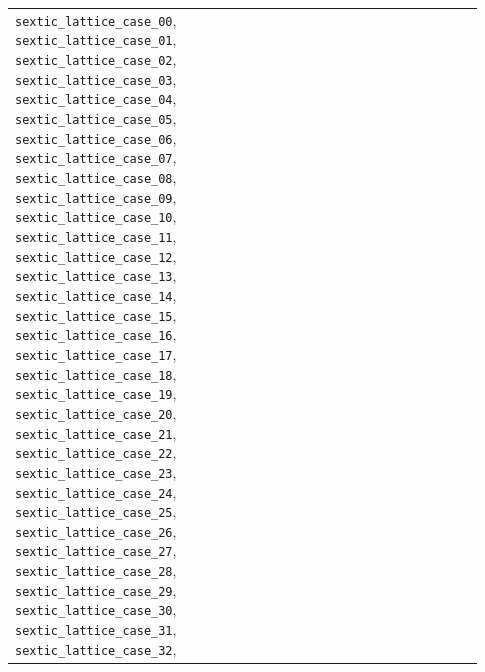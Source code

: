 \begin{longtable}{@{}>{\raggedright\arraybackslash}p{0.31\linewidth}>{\raggedright\arraybackslash}p{0.62\linewidth}@{}}
\texttt{sextic\_}\allowbreak\texttt{lattice\_}\allowbreak\texttt{case\_}\allowbreak\texttt{00}, \texttt{sextic\_}\allowbreak\texttt{lattice\_}\allowbreak\texttt{case\_}\allowbreak\texttt{01}, \texttt{sextic\_}\allowbreak\texttt{lattice\_}\allowbreak\texttt{case\_}\allowbreak\texttt{02}, \texttt{sextic\_}\allowbreak\texttt{lattice\_}\allowbreak\texttt{case\_}\allowbreak\texttt{03}, \texttt{sextic\_}\allowbreak\texttt{lattice\_}\allowbreak\texttt{case\_}\allowbreak\texttt{04}, \texttt{sextic\_}\allowbreak\texttt{lattice\_}\allowbreak\texttt{case\_}\allowbreak\texttt{05}, \texttt{sextic\_}\allowbreak\texttt{lattice\_}\allowbreak\texttt{case\_}\allowbreak\texttt{06}, \texttt{sextic\_}\allowbreak\texttt{lattice\_}\allowbreak\texttt{case\_}\allowbreak\texttt{07}, \texttt{sextic\_}\allowbreak\texttt{lattice\_}\allowbreak\texttt{case\_}\allowbreak\texttt{08}, \texttt{sextic\_}\allowbreak\texttt{lattice\_}\allowbreak\texttt{case\_}\allowbreak\texttt{09}, \texttt{sextic\_}\allowbreak\texttt{lattice\_}\allowbreak\texttt{case\_}\allowbreak\texttt{10}, \texttt{sextic\_}\allowbreak\texttt{lattice\_}\allowbreak\texttt{case\_}\allowbreak\texttt{11}, \texttt{sextic\_}\allowbreak\texttt{lattice\_}\allowbreak\texttt{case\_}\allowbreak\texttt{12}, \texttt{sextic\_}\allowbreak\texttt{lattice\_}\allowbreak\texttt{case\_}\allowbreak\texttt{13}, \texttt{sextic\_}\allowbreak\texttt{lattice\_}\allowbreak\texttt{case\_}\allowbreak\texttt{14}, \texttt{sextic\_}\allowbreak\texttt{lattice\_}\allowbreak\texttt{case\_}\allowbreak\texttt{15}, \texttt{sextic\_}\allowbreak\texttt{lattice\_}\allowbreak\texttt{case\_}\allowbreak\texttt{16}, \texttt{sextic\_}\allowbreak\texttt{lattice\_}\allowbreak\texttt{case\_}\allowbreak\texttt{17}, \texttt{sextic\_}\allowbreak\texttt{lattice\_}\allowbreak\texttt{case\_}\allowbreak\texttt{18}, \texttt{sextic\_}\allowbreak\texttt{lattice\_}\allowbreak\texttt{case\_}\allowbreak\texttt{19}, \texttt{sextic\_}\allowbreak\texttt{lattice\_}\allowbreak\texttt{case\_}\allowbreak\texttt{20}, \texttt{sextic\_}\allowbreak\texttt{lattice\_}\allowbreak\texttt{case\_}\allowbreak\texttt{21}, \texttt{sextic\_}\allowbreak\texttt{lattice\_}\allowbreak\texttt{case\_}\allowbreak\texttt{22}, \texttt{sextic\_}\allowbreak\texttt{lattice\_}\allowbreak\texttt{case\_}\allowbreak\texttt{23}, \texttt{sextic\_}\allowbreak\texttt{lattice\_}\allowbreak\texttt{case\_}\allowbreak\texttt{24}, \texttt{sextic\_}\allowbreak\texttt{lattice\_}\allowbreak\texttt{case\_}\allowbreak\texttt{25}, \texttt{sextic\_}\allowbreak\texttt{lattice\_}\allowbreak\texttt{case\_}\allowbreak\texttt{26}, \texttt{sextic\_}\allowbreak\texttt{lattice\_}\allowbreak\texttt{case\_}\allowbreak\texttt{27}, \texttt{sextic\_}\allowbreak\texttt{lattice\_}\allowbreak\texttt{case\_}\allowbreak\texttt{28}, \texttt{sextic\_}\allowbreak\texttt{lattice\_}\allowbreak\texttt{case\_}\allowbreak\texttt{29}, \texttt{sextic\_}\allowbreak\texttt{lattice\_}\allowbreak\texttt{case\_}\allowbreak\texttt{30}, \texttt{sextic\_}\allowbreak\texttt{lattice\_}\allowbreak\texttt{case\_}\allowbreak\texttt{31}, \texttt{sextic\_}\allowbreak\texttt{lattice\_}\allowbreak\texttt{case\_}\allowbreak\texttt{32}, 
\end{longtable}
